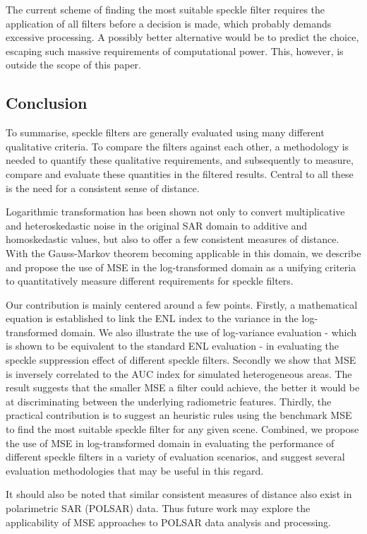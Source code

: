 \documentclass[journal]{IEEEtran}
\begin{document}
The current scheme of finding the most suitable speckle filter requires the application of all filters before 
a decision is made, which probably demands excessive processing. 
A possibly better alternative would be to predict the choice, escaping such massive requirements of computational power.
This, however, is outside the scope of this paper.

\subsection{Conclusion}

To summarise, speckle filters are generally evaluated using many different qualitative criteria.
To compare the filters against each other, a methodology is needed
  to quantify these qualitative requirements,
  and subsequently to measure, compare and evaluate these quantities in the filtered results.
Central to all these is the need for a consistent sense of distance.

Logarithmic transformation has been shown 
  not only to convert multiplicative and heteroskedastic noise in the original SAR domain to additive and homoskedastic values,
  but also to offer a few consistent measures of distance.
With the Gauss-Markov theorem becoming applicable in this domain, we describe and propose the use of MSE in the 
log-transformed domain as a unifying criteria to quantitatively measure different requirements for speckle filters.

Our contribution is mainly centered around a few points. 
Firstly, a mathematical equation is established to link the ENL index to the variance in the log-transformed domain. 
We also illustrate the use of log-variance evaluation -
  which is shown to be equivalent to the standard ENL evaluation -
  in evaluating the speckle suppression effect of different speckle filters.
Secondly we show that MSE is inversely correlated to the AUC index for simulated heterogeneous areas.
The result suggests that the smaller MSE a filter could achieve, the better it would
be at discriminating between the underlying radiometric features.
Thirdly, the practical contribution is to suggest an heuristic rules using the benchmark MSE to find 
the most suitable speckle filter for any given scene. 
Combined, we propose the use of MSE in log-transformed domain in evaluating the performance of different speckle filters in a variety of evaluation scenarios, and suggest several evaluation methodologies that may be useful in this regard.

It should also be noted that similar consistent measures of distance also exist in polarimetric SAR (POLSAR) data. 
Thus future work may explore the applicability of MSE approaches to POLSAR data analysis and processing.



\end{document}
